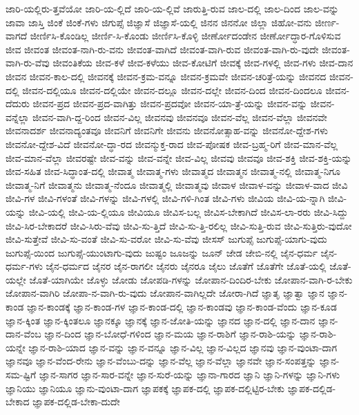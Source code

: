 {ಜಾರಿ-ಯಲ್ಲಿರು-ತ್ತವೆಯೋ
ಜಾರಿ-ಯ-ಲ್ಲಿದೆ
ಜಾರಿ-ಯ-ಲ್ಲಿವೆ
ಜಾರುತ್ತಿ-ರುವ
ಜಾಲ-ದಲ್ಲಿ
ಜಾಲ-ದಿಂದ
ಜಾಲ-ವನ್ನು
ಜಾವಾ
ಜಾಸ್ತಿ
ಜಿಂಕೆ
ಜಿಂಕೆ-ಗಳು
ಜಿಗುಪ್ಸೆ
ಜಿಜ್ಞಾಸೆ
ಜಿಜ್ಞಾಸೆ-ಯಲ್ಲಿ
ಜಿನನ
ಜಿನನೋ
ಜಿಲ್ಲಾ
ಜಿಹೋ-ವನು
ಜೀರ್ಣ-ವಾಗದೆ
ಜೀರ್ಣಿಸಿ-ಕೊಂಡಿಲ್ಲ
ಜೀರ್ಣಿ-ಸಿ-ಕೊಂಡು
ಜೀರ್ಣಿಸಿ-ಕೊಳ್ಳಿ
ಜೀರ್ಣೋದಂಡೇನ
ಜೀರ್ಣೋದ್ಧಾರ-ಗೊಳಿಸುವ
ಜೀವ
ಜೀವಂತ
ಜೀವಂತ-ನಾಗಿ-ರು-ವನು
ಜೀವಂತ-ವಾಗಿದೆ
ಜೀವಂತ-ವಾಗಿ-ರುವ
ಜೀವಂತ-ವಾಗಿ-ರು-ವುದೇ
ಜೀವಂತ-ವಾಗಿ-ರು-ವೆವು
ಜೀವಂತಿಕೆಯ
ಜೀವ-ಕಳೆ
ಜೀವ-ಕಳೆಯು
ಜೀವ-ಕೋಟಿಗೆ
ಜೀವಕ್ಕೆ
ಜೀವ-ಗಳಲ್ಲಿ
ಜೀವ-ಗಳು
ಜೀವ-ದಾನ
ಜೀವನ
ಜೀವನ-ಕಾಲ-ದಲ್ಲಿ
ಜೀವನಕ್ಕೆ
ಜೀವನ-ಕ್ರಮ-ವನ್ನೂ
ಜೀವನ-ಕ್ರಮವೇ
ಜೀವನ-ಚರಿತ್ರೆ-ಯನ್ನು
ಜೀವನದ
ಜೀವನ-ದಲ್ಲಿ
ಜೀವನ-ದಲ್ಲಿಯೂ
ಜೀವನ-ದಲ್ಲಿಯೇ
ಜೀವನ-ದಲ್ಲೂ
ಜೀವನ-ದಲ್ಲೇ
ಜೀವನ-ದಿಂದ
ಜೀವನ-ದಿಂದಲೂ
ಜೀವನ-ದೆದುರು
ಜೀವನ-ಪ್ರದ
ಜೀವನ-ಪ್ರದ-ವಾಗಿತ್ತು
ಜೀವನ-ಪ್ರದವೋ
ಜೀವನ-ಯಾ-ತ್ರೆ-ಯನ್ನು
ಜೀವನ-ವನ್ನು
ಜೀವನ-ವನ್ನೆಲ್ಲಾ
ಜೀವನ-ವಾಗಿ-ದ್ದ-ರಿಂದ
ಜೀವನ-ವಿಲ್ಲ
ಜೀವನವು
ಜೀವನವೂ
ಜೀವನ-ವೆಲ್ಲ
ಜೀವನ-ವೆಲ್ಲಾ
ಜೀವನವೇ
ಜೀವನಾದರ್ಶ
ಜೀವನಾದ್ಯಂತವೂ
ಜೀವನಿಗೆ
ಜೀವನಿಗೇ
ಜೀವನು
ಜೀವನೋತ್ಸಾಹ-ವನ್ನು
ಜೀವನೋ-ದ್ದೇಶ-ಗಳು
ಜೀವನೋ-ದ್ದೇಶ-ವಿದೆ
ಜೀವನೋ-ದ್ಧಾ-ರದ
ಜೀವನ್ಮುಕ್ತ-ರಾದ
ಜೀವ-ಪೋಷಕ
ಜೀವ-ಬ್ರಹ್ಮ-ರಿಗೆ
ಜೀವ-ಮಾನ-ವೆಲ್ಲ
ಜೀವ-ಮಾನ-ವೆಲ್ಲಾ
ಜೀವರಷ್ಟೇ
ಜೀವ-ವನ್ನು
ಜೀವ-ವನ್ನೇ
ಜೀವ-ವಿಲ್ಲ
ಜೀವವು
ಜೀವವೂ
ಜೀವ-ಶಕ್ತಿ
ಜೀವ-ಶಕ್ತಿ-ಯನ್ನು
ಜೀವ-ಸಹಿತ
ಜೀವ-ಸಿದ್ಧಾಂತ-ದಲ್ಲಿ
ಜೀವಾತ್ಮ
ಜೀವಾತ್ಮ-ಗಳು
ಜೀವಾತ್ಮದ
ಜೀವಾತ್ಮನ
ಜೀವಾತ್ಮ-ನಲ್ಲಿ
ಜೀವಾತ್ಮ-ನಿಗೂ
ಜೀವಾತ್ಮ-ನಿಗೆ
ಜೀವಾತ್ಮನು
ಜೀವಾತ್ಮ-ನೆಂದೂ
ಜೀವಾತ್ಮಲ್ಲಿ
ಜೀವಾತ್ಮವು
ಜೀವಾಳ
ಜೀವಾಳ-ವನ್ನು
ಜೀವಾಳ-ವಾದ
ಜೀವಿ
ಜೀವಿ-ಗಳ
ಜೀವಿ-ಗಳಂತೆ
ಜೀವಿ-ಗಳನ್ನು
ಜೀವಿ-ಗಳಲ್ಲಿ
ಜೀವಿ-ಗಳಿ-ಗಿಂತ
ಜೀವಿ-ಗಳು
ಜೀವಿಯ
ಜೀವಿ-ಯ-ನ್ನಾಗಿ
ಜೀವಿ-ಯನ್ನು
ಜೀವಿ-ಯಲ್ಲಿ
ಜೀವಿ-ಯ-ಲ್ಲಿಯೂ
ಜೀವಿಯೂ
ಜೀವಿಸ-ಬಲ್ಲ
ಜೀವಿಸ-ಬೇಕಾಗಿದೆ
ಜೀವಿಸ-ಲಾ-ರರು
ಜೀವಿ-ಸಿದ್ದು
ಜೀವಿ-ಸಿರ-ಬೇಕಾದರೆ
ಜೀವಿ-ಸಿರು-ವೆವು
ಜೀವಿ-ಸು-ತ್ತಿದೆ
ಜೀವಿ-ಸು-ತ್ತಿ-ರಲಿಲ್ಲ
ಜೀವಿ-ಸುತ್ತಿ-ರುವ
ಜೀವಿ-ಸುತ್ತಿರು-ವುದೋ
ಜೀವಿ-ಸುತ್ತೇವೆ
ಜೀವಿ-ಸು-ವಂತೆ
ಜೀವಿ-ಸು-ವರೋ
ಜೀವಿ-ಸು-ವೆವು
ಜೀಸಸ್
ಜುಗುಪ್ಸೆ
ಜುಗುಪ್ಸೆ-ಯಾಗು-ವುದು
ಜುಗುಪ್ಸೆ-ಯಿಂದ
ಜುಗುಪ್ಸೆ-ಯುಂಟಾಗು-ವುದು
ಜುಷ್ಟಂ
ಜೂಜನ್ನು
ಜೂನ್
ಜೇಡ
ಜೇಬಿ-ನಲ್ಲಿ
ಜೈನ-ಧರ್ಮ
ಜೈನ-ಧರ್ಮ-ಗಳು
ಜೈನ-ಧರ್ಮದ
ಜೈನರ
ಜೈನ-ರಾಗಲೀ
ಜೈನರು
ಜೈನರೂ
ಜೈಲು
ಜೊತೆಗೆ
ಜೊತೆಗೇ
ಜೊತೆ-ಯಲ್ಲಿ
ಜೊತೆ-ಯಲ್ಲೇ
ಜೊತೆ-ಯಾಗಿಯೇ
ಜೊಳ್ಳು
ಜೋಡು
ಜೋಪಡಿ-ಗಳನ್ನು
ಜೋಪಾನ-ದಿಂದಿರ-ಬೇಕು
ಜೋಪಾನ-ವಾಗಿ-ರ-ಬೇಕು
ಜೋಪಾನ-ವಾಗಿರಿ
ಜೋಪಾ-ನ-ವಾಗಿ-ರು-ವುದು
ಜೋಪಾನ-ವಾಗಿಲ್ಲದೇ
ಜೋರಾ-ಗಿದೆ
ಜ್ಞಾತೃ
ಜ್ಞಾತ್ವಾ
ಜ್ಞಾನ
ಜ್ಞಾನ-ಕಾಂಡ
ಜ್ಞಾನ-ಕಾಂಡಕ್ಕೆ
ಜ್ಞಾನ-ಕಾಂಡ-ಗಳ
ಜ್ಞಾನ-ಕಾಂಡ-ದಲ್ಲಿ
ಜ್ಞಾನ-ಕಾಂಡವು
ಜ್ಞಾನ-ಕಾಂಡ-ವೆಂದು
ಜ್ಞಾನ-ಕೂಡ
ಜ್ಞಾನ-ಕ್ಕಿಂತ
ಜ್ಞಾನ-ಕ್ಕಿಂತಲೂ
ಜ್ಞಾನಕ್ಕೂ
ಜ್ಞಾನಕ್ಕೆ
ಜ್ಞಾನ-ಜೋತಿ-ಯನ್ನು
ಜ್ಞಾನದ
ಜ್ಞಾನ-ದಲ್ಲಿ
ಜ್ಞಾನ-ದಾನ
ಜ್ಞಾನ-ದಾನ-ವೆಂಬ
ಜ್ಞಾನ-ದಿಂದ
ಜ್ಞಾನ-ಬೋಧೆ-ಗಳಿಂದ
ಜ್ಞಾನ-ಮಯ
ಜ್ಞಾನ-ರಾಶಿಗೆ
ಜ್ಞಾನ-ರಾಶಿ-ಯನ್ನು
ಜ್ಞಾನ-ರಾಶಿ-ಯನ್ನೇ
ಜ್ಞಾನ-ರಾಶಿ-ಯಾದ
ಜ್ಞಾನ-ವನ್ನು
ಜ್ಞಾನ-ವನ್ನೂ
ಜ್ಞಾನ-ವಿಲ್ಲ
ಜ್ಞಾನ-ವಿಲ್ಲದ
ಜ್ಞಾನವು
ಜ್ಞಾನ-ವುಂಟಾ-ದಾಗ
ಜ್ಞಾನವೂ
ಜ್ಞಾನ-ವೆಂದ-ರೇನು
ಜ್ಞಾನ-ವೆಂಬು-ದನ್ನು
ಜ್ಞಾನ-ವೆಲ್ಲ
ಜ್ಞಾನ-ವೆಲ್ಲಾ
ಜ್ಞಾನವೇ
ಜ್ಞಾನ-ಸಂಪತ್ತನ್ನು
ಜ್ಞಾನ-ಸಮ-ಷ್ಟಿಗೆ
ಜ್ಞಾನ-ಸಾಗರ
ಜ್ಞಾನ-ಸಾರ-ವನ್ನೇ
ಜ್ಞಾನ-ಸುರೆ-ಯನ್ನು
ಜ್ಞಾನಾ-ಗಾರದ
ಜ್ಞಾನಿ
ಜ್ಞಾನಿ-ಗಳನ್ನು
ಜ್ಞಾನಿ-ಗಳು
ಜ್ಞಾನಿಯು
ಜ್ಞಾನಿಯೂ
ಜ್ಞಾನು-ವುಂಟಾ-ದಾಗ
ಜ್ಞಾಪಕಕ್ಕೆ
ಜ್ಞಾಪಕ-ದಲ್ಲಿ
ಜ್ಞಾಪಕ-ದಲ್ಲಿಟ್ಟಿರ-ಬೇಕು
ಜ್ಞಾಪಕ-ದಲ್ಲಿಡ-ಬೇಕಾದ
ಜ್ಞಾಪಕ-ದಲ್ಲಿಡ-ಬೇಕಾ-ದುದೇ
}
